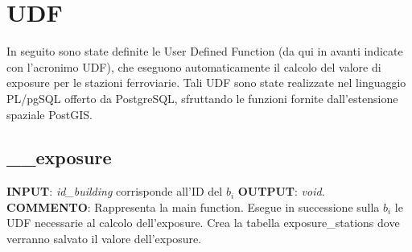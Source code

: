 
\chapter{UDF}



\lstset{style=mystyle}

In seguito sono state definite le User Defined Function (da qui in avanti indicate con l’acronimo UDF), che eseguono automaticamente il calcolo del valore di exposure per le stazioni ferroviarie. Tali UDF sono state realizzate nel linguaggio PL/pgSQL offerto da PostgreSQL, sfruttando le funzioni fornite dall’estensione spaziale PostGIS.

\section{\_\_exposure}
\textbf{INPUT}: \textit{id\_building} corrisponde all'ID del $b_i$ \newline
\textbf{OUTPUT}: \textit{void}. \newline
\textbf{COMMENTO}: Rappresenta la main function. Esegue in successione sulla $b_i$ le UDF necessarie al calcolo dell'exposure. Crea la tabella exposure\_stations dove verranno salvato il valore dell'exposure.   

